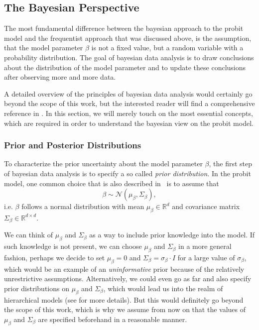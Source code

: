 \subsection{The Bayesian Perspective}

The most fundamental difference between the bayesian approach to
the probit model and the frequentist approach that was discussed above,
is the assumption, that the model parameter $\beta$ is not a fixed
value, but a random variable with a probability distribution.
The goal of bayesian data analysis is to draw conclusions about
the distribution of the model parameter and to update these
conclusions after observing more and more data.

A detailed overview of the principles of bayesian data
analysis would certainly go beyond the scope of this work,
but the interested reader will find a comprehensive reference
in \cite{bayes-gelman}.
In this section, we will merely touch on the most essential concepts,
which are required in order to understand the bayesian view on the
probit model.

\subsubsection{Prior and Posterior Distributions}

To characterize the prior uncertainty about the model parameter $\beta$,
the first step of bayesian data analysis is to specify a so called
\textit{prior distribution}.
In the probit model, one common choice that is also described
in~\cite{regression-fahrmeir} is to assume that
\begin{equation}
    \beta \sim \mathcal{N}(\mu_\beta, \Sigma_\beta),
\end{equation}
i.e. $\beta$ follows a normal distribution with mean
$\mu_\beta \in \mathbb{R}^d$ and
covariance matrix $\Sigma_\beta \in \mathbb{R}^{d \times d}$.

We can think of $\mu_\beta$ and $\Sigma_\beta$ as a way to
include prior knowledge into the model.
If such knowledge is not present, we can choose $\mu_\beta$ and
$\Sigma_\beta$ in a more general fashion, perhaps we decide
to set $\mu_\beta = 0$ and $\Sigma_\beta = \sigma_\beta \cdot I$
for a large value of $\sigma_\beta$, which would
be an example of an \textit{uninformative} prior because of
the relatively unrestrictive assumptions.
Alternatively, we could even go as far and also specify prior
distributions on $\mu_\beta$ and $\Sigma_\beta$, which would
lead us into the realm of hierarchical models
(see \cite{bayes-gelman} for more details). But this would definitely
go beyond the scope of this work, which is why we assume from
now on that the values of $\mu_\beta$ and $\Sigma_\beta$
are specified beforehand in a reasonable manner.

